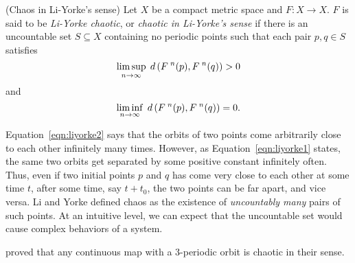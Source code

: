 \documentclass[10pt,draft,twoside]{book}
\begin{document}
\begin{definition}
  (Chaos in Li-Yorke's sense)
  Let $X$ be a compact metric space and $F: X\to X$.
  $F$ is said to be \textit{Li-Yorke chaotic}, or 
  \textit{chaotic in Li-Yorke's sense} if there is an uncountable set $S \subseteq X$ containing no
  periodic points such that each pair $p,q \in S$ satisfies
  \begin{equation}
    \limsup\limits_{n \to \infty}\; d\left( F^{\;n}(p) , F^{\;n}(q) \right) > 0
    \label{eqn:liyorke1}
  \end{equation}
  and
  \begin{equation}
    \liminf\limits_{n \to \infty}\; d\left( F^{\;n}(p) , F^{\;n}(q) \right) = 0.
    \label{eqn:liyorke2}
  \end{equation}
\end{definition}
Equation~\eqref{eqn:liyorke2} says that the orbits of two points come arbitrarily close to each other infinitely many times.
However, as Equation~\eqref{eqn:liyorke1} states, the same two orbits get separated by some positive constant infinitely often.
Thus, even if two initial points $p$ and $q$ has come very close to each other at some time $t$, after some time, say $t + t_0$, the two points can be far apart, and vice versa.
Li and Yorke defined chaos as the existence of \textit{uncountably many} pairs of such points.
At an intuitive level, we can expect that the uncountable set would cause complex behaviors of a system.

\citet{li-yorke} proved that any continuous map with a 3-periodic orbit is chaotic in their sense.
\end{document}

